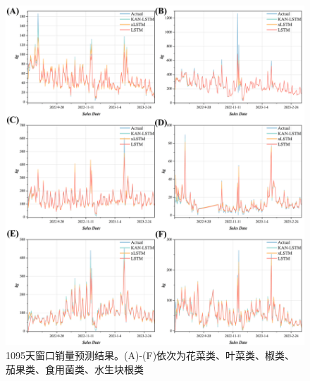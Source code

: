 \documentclass[lang=cn,12pt,a4paper]{elegantpaper}
\begin{document}
\begin{figure}[H]
    \centering
    \includegraphics[width=1\textwidth]{图片7.png}
    \caption{1095天窗口销量预测结果。(A)-(F)依次为花菜类、叶菜类、椒类、茄果类、食用菌类、水生块根类}
    \label{fig:fig7}
\end{figure}
\end{document}
